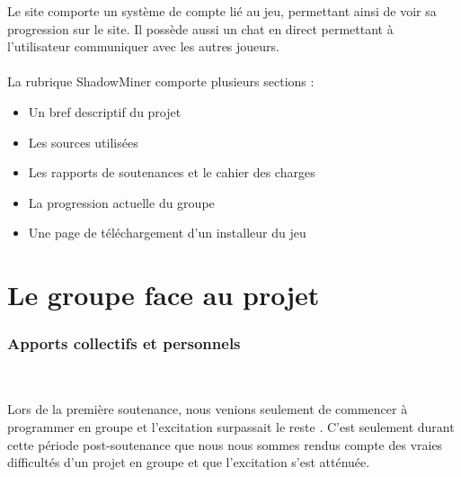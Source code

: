 \documentclass[titlepage, 13px, a4paper]{report}
\begin{document}
Le site comporte un système de compte lié au jeu, permettant ainsi de voir sa progression sur le site.
Il possède aussi un chat en direct permettant à l’utilisateur communiquer avec les autres joueurs. \\ \\

La rubrique ShadowMiner comporte plusieurs sections : \\
{\begin{itemize}
	\item Un bref descriptif du projet
	\item Les sources utilisées
	\item Les rapports de soutenances et le cahier des charges
	\item La progression actuelle du groupe
	\item Une page de téléchargement d’un installeur du jeu
\end{itemize}} 






\part{Le groupe face au projet}

\section{Apports collectifs et personnels}
\paragraph{} \hspace{0pt} \\
Lors de la première soutenance, nous venions seulement de commencer à programmer en groupe et l’excitation surpassait le reste . 
C'est seulement durant cette période post-soutenance que nous nous sommes rendus compte des vraies difficultés 
d'un projet en groupe et que l'excitation s’est atténuée. \\
\end{document}
